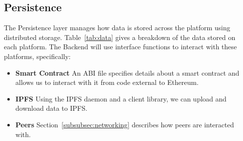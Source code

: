 
\subsection{Persistence}

The Persistence layer manages how data is stored across the platform using distributed storage. Table~\ref{tab:data} gives a breakdown of the data stored on each platform.
\x
The Backend will use interface functions to interact with these platforms, specifically:

\begin{itemize}
  \item \textbf{Smart Contract} An ABI file specifies details about a smart contract and allows us to interact with it from code external to Ethereum.
  \item \textbf{IPFS} Using the IPFS daemon and a client library, we can upload and download data to IPFS.
  \item \textbf{Peers} Section~\ref{subsubsec:networking} describes how peers are interacted with.
\end{itemize}
